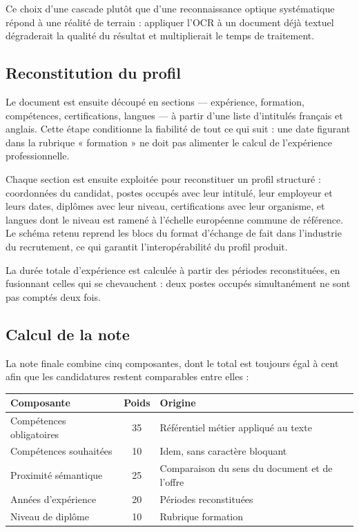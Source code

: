 \documentclass[11pt,a4paper]{article}
\begin{document}
Ce choix d'une cascade plutôt que d'une reconnaissance optique systématique répond à une réalité de terrain : appliquer l'OCR à un document déjà textuel dégraderait la qualité du résultat et multiplierait le temps de traitement.

\subsection{Reconstitution du profil}
Le document est ensuite découpé en sections — expérience, formation, compétences, certifications, langues — à partir d'une liste d'intitulés français et anglais. Cette étape conditionne la fiabilité de tout ce qui suit : une date figurant dans la rubrique « formation » ne doit pas alimenter le calcul de l'expérience professionnelle.

Chaque section est ensuite exploitée pour reconstituer un profil structuré : coordonnées du candidat, postes occupés avec leur intitulé, leur employeur et leurs dates, diplômes avec leur niveau, certifications avec leur organisme, et langues dont le niveau est ramené à l'échelle européenne commune de référence. Le schéma retenu reprend les blocs du format d'échange de fait dans l'industrie du recrutement, ce qui garantit l'interopérabilité du profil produit.

La durée totale d'expérience est calculée à partir des périodes reconstituées, en fusionnant celles qui se chevauchent : deux postes occupés simultanément ne sont pas comptés deux fois.

\subsection{Calcul de la note}
La note finale combine cinq composantes, dont le total est toujours égal à cent afin que les candidatures restent comparables entre elles :

\begin{center}
\small
\begin{tabular}{lcp{7.2cm}}
  \toprule
  \textbf{Composante} & \textbf{Poids} & \textbf{Origine} \\
  \midrule
  Compétences obligatoires & 35 & Référentiel métier appliqué au texte \\
  Compétences souhaitées & 10 & Idem, sans caractère bloquant \\
  Proximité sémantique & 25 & Comparaison du sens du document et de l'offre \\
  Années d'expérience & 20 & Périodes reconstituées \\
  Niveau de diplôme & 10 & Rubrique formation \\
  \bottomrule
\end{tabular}
\end{center}
\end{document}
